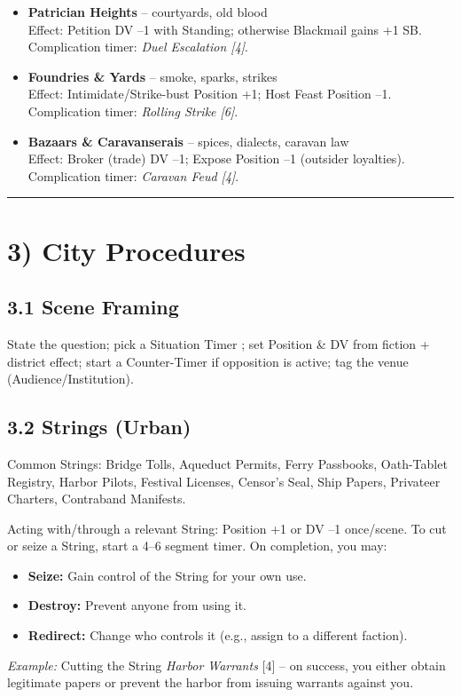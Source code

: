 \documentclass[11pt]{article}
\newcommand{\sectionrule}{\vspace{0.5em}\noindent\textcolor{gray}{\rule{\textwidth}{0.4pt}}\par\vspace{0.5em}}
\begin{document}
\begin{itemize}
    \item \textbf{Patrician Heights} -- courtyards, old blood \\
    Effect: Petition DV --1 with Standing; otherwise Blackmail gains +1 SB. \\
    Complication timer: \textit{Duel Escalation [4]}.
    
    \item \textbf{Foundries \& Yards} -- smoke, sparks, strikes \\
    Effect: Intimidate/Strike-bust Position +1; Host Feast Position --1. \\
    Complication timer: \textit{Rolling Strike [6]}.
    
    \item \textbf{Bazaars \& Caravanserais} -- spices, dialects, caravan law \\
    Effect: Broker (trade) DV --1; Expose Position --1 (outsider loyalties). \\
    Complication timer: \textit{Caravan Feud [4]}.
\end{itemize}

\sectionrule

\section*{3) City Procedures}
\subsection*{3.1 Scene Framing}
State the question; pick a Situation Timer ; set Position \& DV from fiction + district effect; start a Counter-Timer if opposition is active; tag the venue (Audience/Institution).

\subsection*{3.2 Strings (Urban)}
Common Strings: Bridge Tolls, Aqueduct Permits, Ferry Passbooks, Oath-Tablet Registry, Harbor Pilots, Festival Licenses, Censor's Seal, Ship Papers, Privateer Charters, Contraband Manifests.  

Acting with/through a relevant String: Position +1 or DV --1 once/scene.  
To cut or seize a String, start a 4--6 segment timer. On completion, you may:
\begin{itemize}
    \item \textbf{Seize:} Gain control of the String for your own use.
    \item \textbf{Destroy:} Prevent anyone from using it.
    \item \textbf{Redirect:} Change who controls it (e.g., assign to a different faction).
\end{itemize}
\textit{Example:} Cutting the String \textit{Harbor Warrants} [4] -- on success, you either obtain legitimate papers or prevent the harbor from issuing warrants against you.
\end{document}
